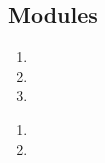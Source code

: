     \subsection{Modules}
        \begin{definition} \label{def: formal_quantum_vertex_algebra_(quasi)_modules}
            \begin{enumerate}
                \item 
                \item 
                \item 
            \end{enumerate}
        \end{definition}
    
        \begin{definition} \label{def: formal_quantum_vertex_algebra_deformed_(quasi)_modules}
            \begin{enumerate}
                \item 
                \item 
            \end{enumerate}
        \end{definition}